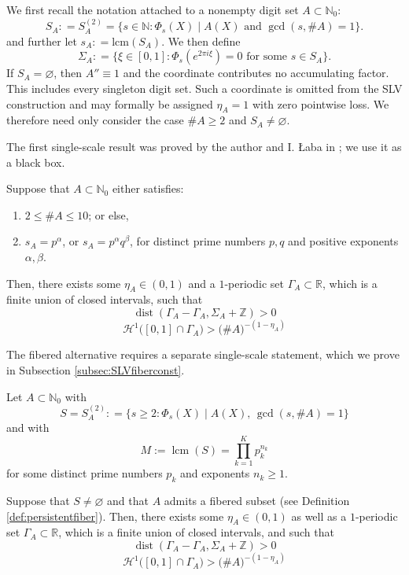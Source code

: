 \documentclass[12pt]{amsart}
\numberwithin{equation}{section}
\DeclareMathOperator{\dist}{dist}
\DeclareMathOperator{\lcm}{lcm}
\begin{document}
We first recall the notation attached to a nonempty digit set $A\subset\mathbb N_0$:
$$
S_{A} : = S_A^{(2)} =  \{s \in \mathbb{N} : \Phi_s (X) \mid A (X) \textrm{ and } \gcd(s,\#A) = 1 \}.
$$
and further let $s_A : = \textrm{lcm} (S_A)$. We then define
$$
\Sigma_A : = \{\xi \in [0,1] : \Phi_s (e^{2 \pi i \xi }) = 0 \textrm{ for some } s \in S_A \}.
$$
If $S_A=\varnothing$, then $A''\equiv1$ and the coordinate contributes no accumulating factor.  This includes every singleton digit set.  Such a coordinate is omitted from the SLV construction and may formally be assigned $\eta_A=1$ with zero pointwise loss.  We therefore need only consider the case $\#A\geq2$ and $S_A\neq\varnothing$.

The first single-scale result was proved by the author and I. {\L}aba in \cite{LM}; we use it as a black box.

\medskip

\begin{lemma}\label{lma:singlescaleSLV}
Suppose that $A \subset \mathbb{N}_0$ either satisfies:
\begin{enumerate}[(1)]
    \item $2 \leq \# A \leq 10$; or else,
    \medskip
    \item $s_A=p^\alpha$, or $s_A = p^{\alpha} q^{\beta}$, for distinct prime numbers $p, q$ and positive exponents $\alpha, \beta$.
\end{enumerate}
Then, there exists some $\eta_A \in (0,1)$ and a $1$-periodic set $\Gamma_A \subset \mathbb{R}$, which is a finite union of closed intervals, such that
\begin{equation}
\dist(\Gamma_A -\Gamma_A ,\Sigma_A + \mathbb{Z}) > 0
\end{equation}
\begin{equation}
\mathcal{H}^1 \big([0, 1] \cap \Gamma_A \big) > \big( \# A\big)^{-(1 - \eta_A)}
\end{equation}
\end{lemma}
The fibered alternative requires a separate single-scale statement, which we prove in Subsection \ref{subsec:SLVfiberconst}.

\medskip

\begin{lemma}\label{lma:singlescaleSLVfibered}
Let $A \subset \mathbb{N}_0$ with
$$
S = S_A^{(2)} : = \big\{s \geq 2 : \Phi_s (X) \mid A(X), \, \gcd (s,\#A) = 1\big\}
$$
and with
$$
M := \lcm (S) = \prod_{k=1}^{K} p_k^{n_k}
$$
for some distinct prime numbers $p_k$ and exponents $n_k \geq 1$. 

Suppose that $S\neq\varnothing$ and that $A$ admits a fibered subset (see Definition \ref{def:persistentfiber}). Then, there exists some $\eta_A \in (0,1)$ as well as a $1$-periodic set $\Gamma_{A} \subset \mathbb{R}$, which is a finite union of closed intervals, and such that
\begin{equation}\label{eq:singlegamma1}
\dist(\Gamma_A -\Gamma_A ,\Sigma_A + \mathbb{Z}) > 0
\end{equation}
\begin{equation}\label{eq:singlegamma2}
\mathcal{H}^1 \big([0, 1] \cap \Gamma_A \big) > \big( \#A\big)^{-(1-\eta_A)}
\end{equation}
\end{lemma}
\end{document}

